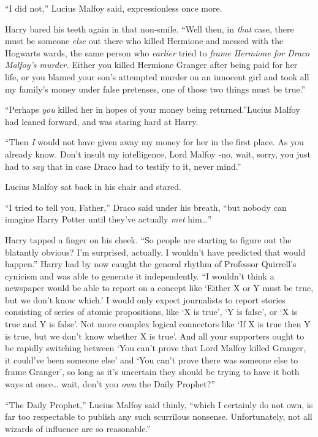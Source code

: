 ``I did not,'' Lucius Malfoy said, expressionless once more.

Harry bared his teeth again in that non-smile. ``Well then, in \emph{that} case, there must be someone \emph{else} out there who killed Hermione and messed with the Hogwarts wards, the same person who \emph{earlier} tried to \emph{frame Hermione for Draco Malfoy's murder.} Either you killed Hermione Granger after being paid for her life, or you blamed your son's attempted murder on an innocent girl and took all my family's money under false pretenses, one of those two things must be true.''

``Perhaps \emph{you} killed her in hopes of your money being returned.''Lucius Malfoy had leaned forward, and was staring hard at Harry.

``Then \emph{I} would not have given away my money for her in the first place. As you already know. Don't insult my intelligence, Lord Malfoy -no, wait, sorry, you just had to \emph{say} that in case Draco had to testify to it, never mind.''

Lucius Malfoy sat back in his chair and stared.

``I tried to tell you, Father,'' Draco said under his breath, ``but nobody can imagine Harry Potter until they've actually \emph{met} him\ldots{}''

Harry tapped a finger on his cheek. ``So people are starting to figure out the blatantly obvious? I'm surprised, actually. I wouldn't have predicted that would happen.'' Harry had by now caught the general rhythm of Professor Quirrell's cynicism and was able to generate it independently. ``I wouldn't think a newspaper would be able to report on a concept like `Either X or Y must be true, but we don't know which.' I would only expect journalists to report stories consisting of series of atomic propositions, like `X is true', `Y is false', or `X is true and Y is false'. Not more complex logical connectors like `If X is true then Y is true, but we don't know whether X is true'. And all your supporters ought to be rapidly switching between `You can't prove that Lord Malfoy killed Granger, it could've been someone else' and `You can't prove there was someone else to frame Granger', so long as it's uncertain they should be trying to have it both ways at once\ldots{} wait, don't you \emph{own} the Daily Prophet?''

``The Daily Prophet,'' Lucius Malfoy said thinly, ``which I certainly do not own, is far too respectable to publish any such scurrilous nonsense. Unfortunately, not all wizards of influence are so reasonable.''


